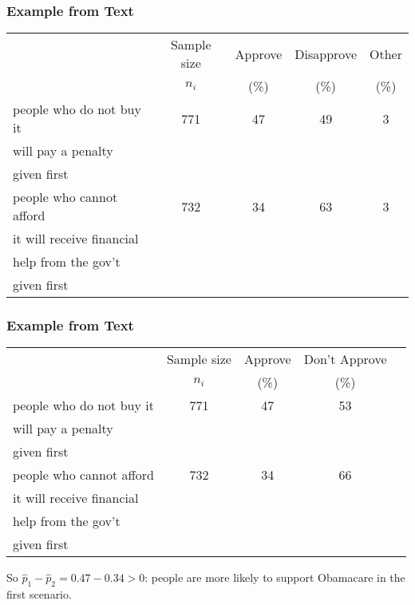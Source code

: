 \documentclass[handout]{beamer}
\newcommand{\blue}[1]{\textcolor{blue2}{#1}}
\newcommand{\phat}{\widehat{p}}
\begin{document}
\begin{frame}[fragile]
\frametitle{Example from Text}

\begin{small}
\begin{center}
  \begin{tabular}{l|cccc}
     & Sample size & Approve & Disapprove & Other \\ 
     &  $n_i$ & (\%) & (\%) &  (\%)\\   
  \hline
    \blue{people who do not buy it}   & 771 & 47 & 49 & 3 \\ 
    \blue{will pay a penalty}  & &  &  &  \\ 
    given first & &  &  &  \\     
    \hline
    \blue{people who cannot afford} & 732 & 34 & 63 & 3 \\ 
    \blue{it will receive financial}  & & & &  \\ 
    \blue{help from the gov't} & & & &  \\ 
    given first & & & &  \\    
   \end{tabular}
\end{center}
\end{small}

\end{frame}


\begin{frame}[fragile]
\frametitle{Example from Text}

\begin{small}
\begin{center}
  \begin{tabular}{l|cccc}
     & Sample size & Approve & Don't Approve \\ 
     &  $n_i$ & (\%) & (\%) \\   
  \hline
    \blue{people who do not buy it}   & 771 & 47 & 53 \\ 
    \blue{will pay a penalty}\\ 
    given first\\     
    \hline
    \blue{people who cannot afford} & 732 & 34 & 66 \\ 
    \blue{it will receive financial}\\ 
    \blue{help from the gov't}\\ 
    given first\\    
   \end{tabular}
\end{center}
\end{small}
\pause So $\phat_1 - \phat_2 = 0.47 - 0.34 > 0$:  people are more likely to support Obamacare in the first scenario.
\end{frame}
\end{document}
